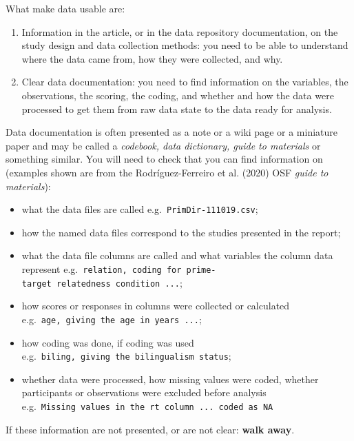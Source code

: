 \documentclass[
  letterpaper,
  DIV=11,
  numbers=noendperiod]{scrreprt}
\providecommand{\tightlist}{%
  \setlength{\itemsep}{0pt}\setlength{\parskip}{0pt}}\usepackage{longtable,booktabs,array}
\begin{document}
What make data usable are:

\begin{enumerate}
\def\labelenumi{\arabic{enumi}.}
\tightlist
\item
  Information in the article, or in the data repository documentation,
  on the study design and data collection methods: you need to be able
  to understand where the data came from, how they were collected, and
  why.
\item
  Clear data documentation: you need to find information on the
  variables, the observations, the scoring, the coding, and whether and
  how the data were processed to get them from raw data state to the
  data ready for analysis.
\end{enumerate}

Data documentation is often presented as a note or a wiki page or a
miniature paper and may be called a \emph{codebook, data dictionary,
guide to materials} or something similar. You will need to check that
you can find information on (examples shown are from the
Rodríguez-Ferreiro et al. (2020) OSF \emph{guide to materials}):

\begin{itemize}
\tightlist
\item
  what the data files are called e.g.~\texttt{PrimDir-111019.csv};
\item
  how the named data files correspond to the studies presented in the
  report;
\item
  what the data file columns are called and what variables the column
  data represent
  e.g.~\texttt{relation,\ coding\ for\ prime-target\ relatedness\ condition\ ...};
\item
  how scores or responses in columns were collected or calculated
  e.g.~\texttt{age,\ giving\ the\ age\ in\ years\ ...};
\item
  how coding was done, if coding was used
  e.g.~\texttt{biling,\ giving\ the\ bilingualism\ status};
\item
  whether data were processed, how missing values were coded, whether
  participants or observations were excluded before analysis
  e.g.~\texttt{Missing\ values\ in\ the\ rt\ column\ ...\ coded\ as\ NA}
\end{itemize}

\begin{tcolorbox}[enhanced jigsaw, opacitybacktitle=0.6, title=\textcolor{quarto-callout-warning-color}{\faExclamationTriangle}\hspace{0.5em}{Warning}, arc=.35mm, colbacktitle=quarto-callout-warning-color!10!white, colframe=quarto-callout-warning-color-frame, leftrule=.75mm, opacityback=0, breakable, titlerule=0mm, left=2mm, bottomrule=.15mm, toprule=.15mm, colback=white, coltitle=black, bottomtitle=1mm, toptitle=1mm, rightrule=.15mm]

If these information are not presented, or are not clear: \textbf{walk
away}.

\end{tcolorbox}
\end{document}
